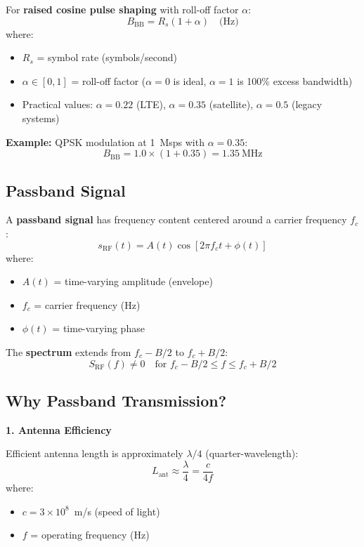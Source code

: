 For \textbf{raised cosine pulse shaping} with roll-off factor $\alpha$:
\begin{equation}
B_{\text{BB}} = R_s(1 + \alpha) \quad \text{(Hz)}
\end{equation}
where:
\begin{itemize}
\item $R_s$ = symbol rate (symbols/second)
\item $\alpha \in [0, 1]$ = roll-off factor ($\alpha = 0$ is ideal, $\alpha = 1$ is 100\% excess bandwidth)
\item Practical values: $\alpha = 0.22$ (LTE), $\alpha = 0.35$ (satellite), $\alpha = 0.5$ (legacy systems)
\end{itemize}

\textbf{Example:} QPSK modulation at 1~Msps with $\alpha = 0.35$:
\begin{equation}
B_{\text{BB}} = 1.0 \times (1 + 0.35) = 1.35~\text{MHz}
\end{equation}

\subsection{Passband Signal}

A \textbf{passband signal} has frequency content centered around a carrier frequency $f_c$:
\begin{equation}
s_{\text{RF}}(t) = A(t)\cos[2\pi f_c t + \phi(t)]
\end{equation}
where:
\begin{itemize}
\item $A(t)$ = time-varying amplitude (envelope)
\item $f_c$ = carrier frequency (Hz)
\item $\phi(t)$ = time-varying phase
\end{itemize}

The \textbf{spectrum} extends from $f_c - B/2$ to $f_c + B/2$:
\begin{equation}
S_{\text{RF}}(f) \neq 0 \quad \text{for } f_c - B/2 \leq f \leq f_c + B/2
\end{equation}

\subsection{Why Passband Transmission?}

\textbf{1. Antenna Efficiency}

Efficient antenna length is approximately $\lambda/4$ (quarter-wavelength):
\begin{equation}
L_{\text{ant}} \approx \frac{\lambda}{4} = \frac{c}{4f}
\end{equation}
where:
\begin{itemize}
\item $c = 3 \times 10^8$~m/s (speed of light)
\item $f$ = operating frequency (Hz)
\end{itemize}

